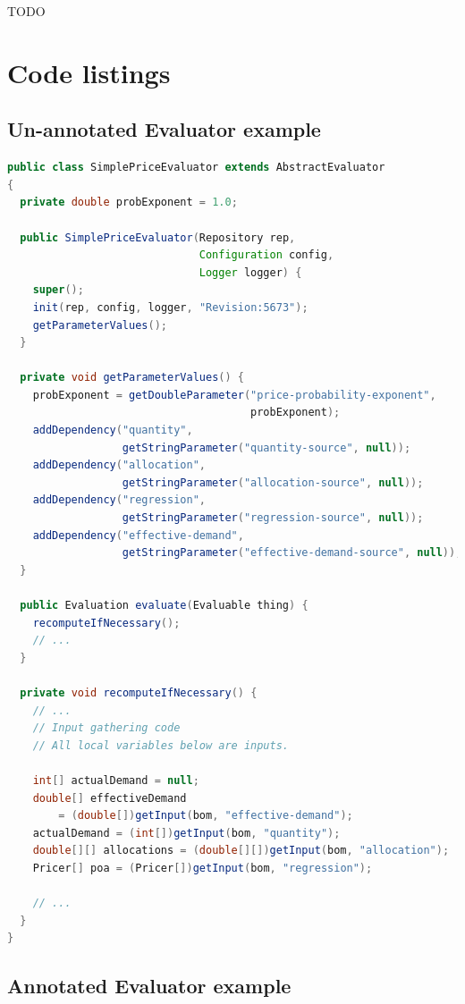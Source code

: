 \documentclass{article}
\begin{document}
TODO

\clearpage



\clearpage
\appendix

\section{Code listings}

\subsection{Un-annotated Evaluator example}
\label{sec:unannotatedeval}

{\small
\begin{lstlisting}[language={Java}]
public class SimplePriceEvaluator extends AbstractEvaluator
{
  private double probExponent = 1.0;

  public SimplePriceEvaluator(Repository rep,
                              Configuration config,
                              Logger logger) {
    super();
    init(rep, config, logger, "Revision:5673");
    getParameterValues();
  }

  private void getParameterValues() {
    probExponent = getDoubleParameter("price-probability-exponent",
                                      probExponent);
    addDependency("quantity",
                  getStringParameter("quantity-source", null));
    addDependency("allocation",
                  getStringParameter("allocation-source", null));
    addDependency("regression",
                  getStringParameter("regression-source", null));
    addDependency("effective-demand",
                  getStringParameter("effective-demand-source", null));
  }

  public Evaluation evaluate(Evaluable thing) {
    recomputeIfNecessary();
    // ...
  }

  private void recomputeIfNecessary() {
    // ...
    // Input gathering code
    // All local variables below are inputs.

    int[] actualDemand = null;
    double[] effectiveDemand
        = (double[])getInput(bom, "effective-demand");
    actualDemand = (int[])getInput(bom, "quantity");
    double[][] allocations = (double[][])getInput(bom, "allocation");
    Pricer[] poa = (Pricer[])getInput(bom, "regression");

    // ...
  }
}
\end{lstlisting}
}

\clearpage
\subsection{Annotated Evaluator example}
\label{sec:annotatedeval}
\end{document}
